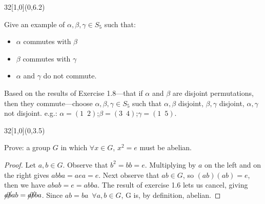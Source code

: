 \documentclass[12pt]{article}
\newenvironment{exercise}[2]{\begin{textblock}{32}[1,0](0,#2)\noindent#1\end{textblock}}{\vspace{1in}}
\begin{document}
%

\begin{exercise}{1.18}{6.2} %
	{\noindent}Give an example of $\alpha, \beta, \gamma\in S_5$ such that:
	\begin{itemize}
		\item $\alpha$ commutes with $\beta$
		\item $\beta$ commutes with $\gamma$
		\item $\alpha$ and $\gamma$ do not commute.
	\end{itemize}
	\bigskip
	Based on the results of Exercise 1.8---that if $\alpha$ and $\beta$ are disjoint permutations,
	then they commute---choose $\alpha, \beta, \gamma\in S_5$ such that $\alpha, \beta$ disjoint,
	$\beta, \gamma$ disjoint, $\alpha, \gamma$ not disjoint. e.g.:
	$\alpha = (1\enspace2)$;\quad $\beta = (3\enspace4)$;\quad $\gamma = (1\enspace5)$.
\end{exercise}


%


\begin{exercise}{1.26}{3.5} %
	{\noindent}Prove: a group $G$ in which $\forall x\in G$, $x^2=e$ must be abelian.
	\bigskip

	\begin{proof}
		Let $a, b\in G$. Observe that $b^2 = bb = e$. Multiplying by $a$ on the left and on the right gives
		$abba = aea = e$. Next observe that $ab\in G$, so $(ab)(ab) = e$, then we have $abab = e = abba$. The result of
		exercise 1.6 lets us cancel, giving $\cancel{a}\cancel{b}ab = \cancel{a}\cancel{b}ba$. Since $ab = ba\enspace
		\forall a, b \in G$, G is, by definition, abelian.
	\end{proof}
\end{exercise}
\end{document}
